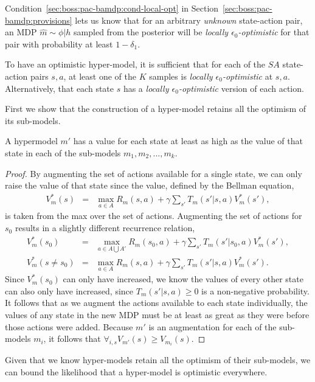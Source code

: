 Condition~\ref{sec:boss:pac-bamdp:cond-local-opt} in Section~\ref{sec:boss:pac-bamdp:provisions} lets us know that for an arbitrary \emph{unknown} state-action pair, an MDP $\hat m\sim \phi|h$ sampled from the posterior will be \emph{locally $\epsilon_0$-optimistic} for that pair with probability at least $1-\delta_1$.

To have an optimistic hyper-model, it is sufficient that for each of the $S A$ state-action pairs $s,a$, at least one of the $K$ samples is \emph{locally $\epsilon_0$-optimistic} at $s,a$. Alternatively, that each state $s$ has a \emph{locally $\epsilon_0$-optimistic} version of each action.

First we show that the construction of a hyper-model retains all the optimism of its sub-models.

\begin{lemma}
A hypermodel $m'$ has a value for each state at least as high as the value of that state in each of the sub-models $m_1, m_2, ..., m_k$.
\end{lemma}
\begin{proof}
By augmenting the set of actions available for a single state, we can only raise the value of that state since the value, defined by the Bellman equation,
\begin{eqnarray}
V^*_m(s) &=& \max_{a \in A} R_m(s,a)+\gamma \sum_{s'} T_m(s'|s,a)V^*_m(s'),
\end{eqnarray}
is taken from the max over the set of actions. Augmenting the set of actions for $s_0$ results in a slightly different recurrence relation,
\begin{eqnarray}
V^*_m(s_0) &=& \max_{a \in A \bigcup A'} R_m(s_0,a)+\gamma \sum_{s'} T_m(s'|s_0,a)V^*_m(s'),\\
V^*_m(s\neq s_0) &=& \max_{a \in A} R_m(s,a)+\gamma \sum_{s'} T_m(s'|s,a)V^*_m(s').
\end{eqnarray}
Since $V^*_m(s_0)$ can only have increased, we  know the values of every other state can also only have increased, since $T_m(s'|s,a) \geq 0$ is a non-negative probability. It follows that as we augment the actions available to each state individually, the values of any state in the new MDP must be at least as great as they were before those actions were added. Because $m'$ is an augmentation for each of the sub-models $m_i$, it follows that $\forall_{i,s} V_{m'}(s) \geq V_{m_i}(s)$.
\end{proof}

Given that we know hyper-models retain all the optimism of their sub-models, we can bound the likelihood that a hyper-model is optimistic everywhere.

